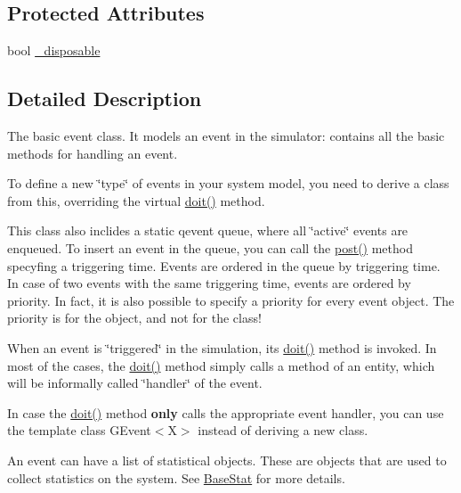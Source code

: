 \subsection*{Protected Attributes}
\begin{DoxyCompactItemize}
\item 
bool \hyperlink{classMetaSim_1_1Event_aba0334f8032e55737e7a7121e183ae88}{\+\_\+disposable}
\end{DoxyCompactItemize}


\subsection{Detailed Description}
The basic event class. It models an event in the simulator\+: contains all the basic methods for handling an event.

To define a new \char`\"{}type\char`\"{} of events in your system model, you need to derive a class from this, overriding the virtual \hyperlink{classMetaSim_1_1Event_ac9621898eb5775271ca3e0197c27674a}{doit()} method.

This class also inclides a static qevent queue, where all \char`\"{}active\char`\"{} events are enqueued. To insert an event in the queue, you can call the \hyperlink{classMetaSim_1_1Event_adc72458c7ea70de9f0c5420f5c66da38}{post()} method specyfing a triggering time. Events are ordered in the queue by triggering time. In case of two events with the same triggering time, events are ordered by priority. In fact, it is also possible to specify a priority for every event object. The priority is for the object, and not for the class!

When an event is \char`\"{}triggered\char`\"{} in the simulation, its \hyperlink{classMetaSim_1_1Event_ac9621898eb5775271ca3e0197c27674a}{doit()} method is invoked. In most of the cases, the \hyperlink{classMetaSim_1_1Event_ac9621898eb5775271ca3e0197c27674a}{doit()} method simply calls a method of an entity, which will be informally called \char`\"{}handler\char`\"{} of the event.

In case the \hyperlink{classMetaSim_1_1Event_ac9621898eb5775271ca3e0197c27674a}{doit()} method {\bfseries only} calls the appropriate event handler, you can use the template class G\+Event$<$\+X$>$ instead of deriving a new class.

An event can have a list of statistical objects. These are objects that are used to collect statistics on the system. See \hyperlink{classMetaSim_1_1BaseStat}{Base\+Stat} for more details.

